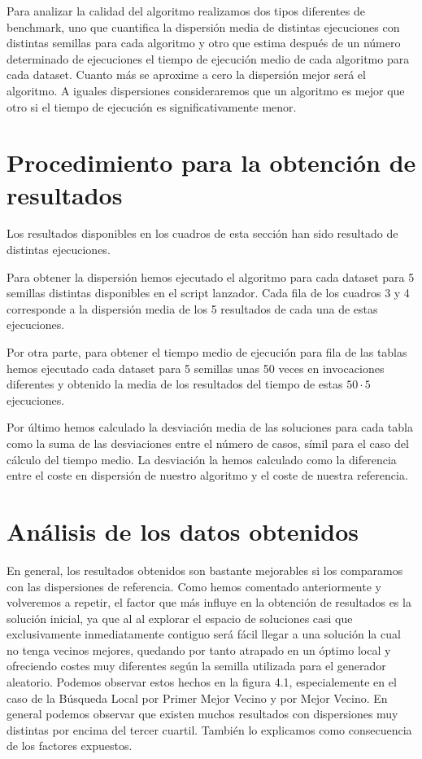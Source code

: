 Para analizar la calidad del algoritmo realizamos dos tipos diferentes de benchmark, uno que cuantifica la dispersión
media de distintas ejecuciones con distintas semillas para cada algoritmo y otro que estima después de un número
determinado de ejecuciones el tiempo de ejecución medio de cada algoritmo para cada dataset. Cuanto más se aproxime
a cero la dispersión mejor será el algoritmo. A iguales dispersiones consideraremos que un algoritmo es mejor que otro
si el tiempo de ejecución es significativamente menor.

\section{Procedimiento para la obtención de resultados}

Los resultados disponibles en los cuadros de esta sección han sido resultado de distintas ejecuciones.

Para obtener la dispersión hemos ejecutado el algoritmo para cada dataset para 5 semillas distintas disponibles
en el script lanzador. Cada fila de los cuadros 3 y 4 corresponde a la dispersión media de los 5 resultados de cada
una de estas ejecuciones.

Por otra parte, para obtener el tiempo medio de ejecución para fila de las tablas hemos ejecutado cada dataset
para 5 semillas unas 50 veces en invocaciones diferentes y obtenido la media de los resultados del tiempo de estas
$ 50 \cdot 5 $ ejecuciones.

Por último hemos calculado la desviación media de las soluciones para cada tabla como la suma de las desviaciones
entre el número de casos, símil para el caso del cálculo del tiempo medio. La desviación la hemos calculado como la
diferencia entre el coste en dispersión de nuestro algoritmo y el coste de nuestra referencia.




\section{Análisis de los datos obtenidos}

En general, los resultados obtenidos son bastante mejorables si los comparamos con las dispersiones de referencia. Como hemos
comentado anteriormente y volveremos a repetir, el factor que más influye en la obtención de resultados es la solución inicial,
ya que al al explorar el espacio de soluciones casi que exclusivamente inmediatamente contiguo será fácil llegar a una solución
la cual no tenga vecinos mejores, quedando por tanto atrapado en un óptimo local y ofreciendo costes muy diferentes según la semilla
utilizada para el generador aleatorio.
Podemos observar estos hechos en la figura 4.1, especialemente en el caso de la Búsqueda Local por Primer Mejor Vecino y por Mejor Vecino.
En general podemos observar que existen muchos resultados con dispersiones muy distintas por encima del tercer cuartil. También lo explicamos
como consecuencia de los factores expuestos.

